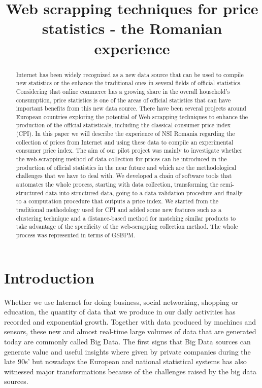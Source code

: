 \documentclass[]{article}
\title{Web scrapping techniques for price statistics -  the Romanian experience}
\author{}
\begin{document}
	
	\maketitle
	
	\begin{abstract}
		Internet has been widely recognized as a new data source that can be used to compile new statistics or the enhance the 
		traditional ones in several fields of official statistics. Considering that online commerce has a growing share in the 
		overall household’s consumption, price statistics is one of the areas of official statistics that can have important 
		benefits from this new data source. There have been several projects around European countries exploring the potential 
		of Web scrapping techniques to enhance the production of the official statisticals, including the classical consumer price index (CPI). 
		In this paper we will describe the experience of NSI Romania regarding the collection of prices from Internet and 
		using these data to compile an experimental consumer price index. The aim of our pilot project was mainly to investigate whether 
		the web-scrapping method of data collection for prices can be introduced in the production of official statistics in the near future 
		and which are the methodological challenges that we have to deal with.  
		We developed a chain of software tools that automates the whole process, starting with data collection, transforming the semi-structured 
		data into structured data, going to a data validation procedure and finally to a computation procedure that outputs a price index. 
		We started from the traditional methodology used for CPI and added some new features such as a clustering technique and a 
		distance-based method for matching similar products to take advantage of the specificity of the web-scrapping collection method. 
		The whole process was represented in terms of GSBPM.
	\end{abstract}
	
	\section{Introduction}
	
	Whether we use Internet for doing business, social networking, shopping or education, the quantity of data that 
	we produce in our daily activities has recorded and exponential growth. Together with data produced by machines and sensors, these new and 
	almost real-time large volumes of data that are generated today are commonly called Big Data. The first signs that Big Data sources 
	can generate value and useful insights where given by private companies during the late 90s' but nowadays the European and national 
	statistical systems has also witnessed major transformations because of the challenges raised by the big data sources. 
	
\end{document}
